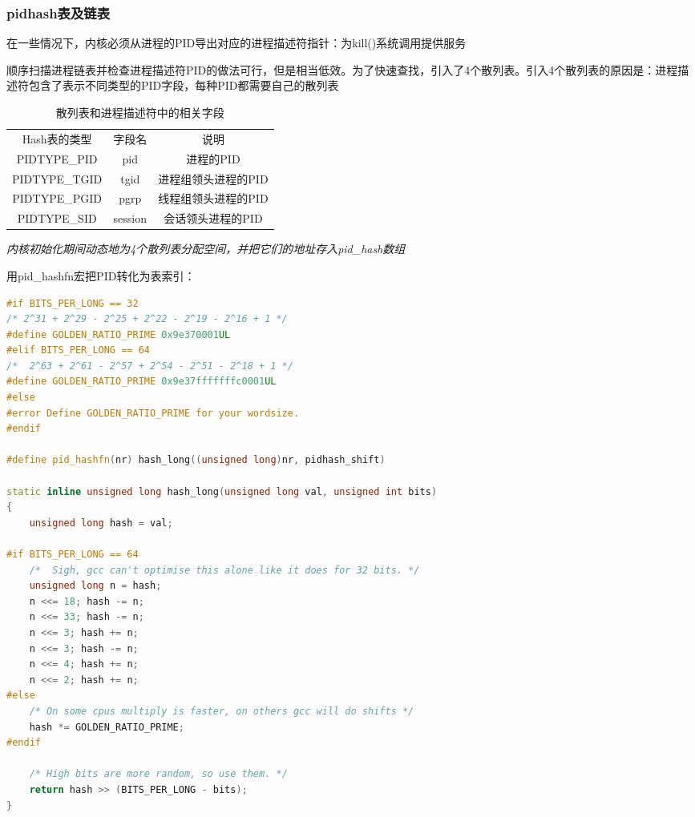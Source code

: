\subsubsection{pidhash表及链表}

    在一些情况下，内核必须从进程的PID导出对应的进程描述符指针：为kill()系统调用提供服务

    顺序扫描进程链表并检查进程描述符PID的做法可行，但是相当低效。为了快速查找，引入了4个散列表。引入4个散列表的原因是：进程描述符包含了表示不同类型的PID字段，每种PID都需要自己的散列表

\begin{table}[!htbp]
    \begin{center}
        \caption{散列表和进程描述符中的相关字段}
        \begin{tabular}{c c c}
            \hline
            Hash表的类型 & 字段名 & 说明 \\
            PIDTYPE\_PID & pid & 进程的PID \\
            PIDTYPE\_TGID & tgid & 进程组领头进程的PID \\
            PIDTYPE\_PGID & pgrp & 线程组领头进程的PID \\
            PIDTYPE\_SID & session & 会话领头进程的PID \\
            \hline
        \end{tabular}
    \end{center}
\end{table}

    \emph{内核初始化期间动态地为4个散列表分配空间，并把它们的地址存入pid\_hash数组}

    用pid\_hashfn宏把PID转化为表索引：

\begin{lstlisting}[language=C++]
#if BITS_PER_LONG == 32
/* 2^31 + 2^29 - 2^25 + 2^22 - 2^19 - 2^16 + 1 */
#define GOLDEN_RATIO_PRIME 0x9e370001UL
#elif BITS_PER_LONG == 64
/*  2^63 + 2^61 - 2^57 + 2^54 - 2^51 - 2^18 + 1 */
#define GOLDEN_RATIO_PRIME 0x9e37fffffffc0001UL
#else
#error Define GOLDEN_RATIO_PRIME for your wordsize.
#endif

#define pid_hashfn(nr) hash_long((unsigned long)nr, pidhash_shift)

static inline unsigned long hash_long(unsigned long val, unsigned int bits)
{
	unsigned long hash = val;

#if BITS_PER_LONG == 64
	/*  Sigh, gcc can't optimise this alone like it does for 32 bits. */
	unsigned long n = hash;
	n <<= 18; hash -= n;
	n <<= 33; hash -= n;
	n <<= 3; hash += n;
	n <<= 3; hash -= n;
	n <<= 4; hash += n;
	n <<= 2; hash += n;
#else
	/* On some cpus multiply is faster, on others gcc will do shifts */
	hash *= GOLDEN_RATIO_PRIME;
#endif

	/* High bits are more random, so use them. */
	return hash >> (BITS_PER_LONG - bits);
}
\end{lstlisting}

